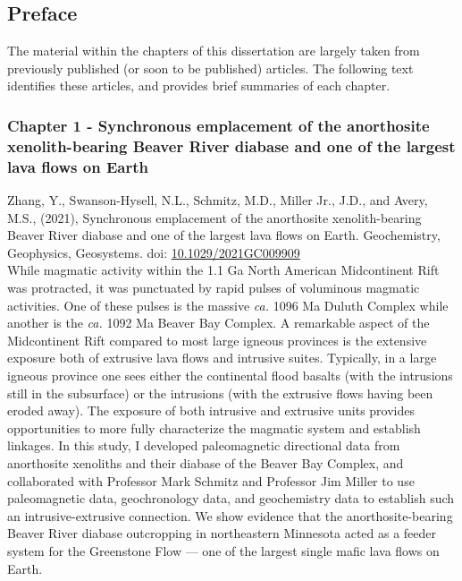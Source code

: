 \documentclass{ucbthesis}
\begin{document}
\begin{frontmatter}

\tableofcontents
\clearpage
\listoffigures
\clearpage
\listoftables

\clearpage


\chapter*{Preface}

The material within the chapters of this dissertation are largely taken from previously published (or soon to be published) articles. The following text identifies these articles, and provides brief summaries of each chapter.

\subsection{Chapter 1 - Synchronous emplacement of the anorthosite xenolith-bearing Beaver River diabase and one of the largest lava flows on Earth}

Zhang, Y., Swanson-Hysell, N.L., Schmitz, M.D., Miller Jr., J.D., and Avery, M.S., (2021), Synchronous emplacement of the anorthosite xenolith-bearing Beaver River diabase and one of the largest lava flows on Earth. Geochemistry, Geophysics, Geosystems. doi: \url{10.1029/2021GC009909}
\\

While magmatic activity within the 1.1 Ga North American Midcontinent Rift was protracted, it was punctuated by rapid pulses of voluminous magmatic activities. One of these pulses is the massive \textit{ca.} 1096 Ma Duluth Complex while another is the \textit{ca.} 1092 Ma Beaver Bay Complex. A remarkable aspect of the Midcontinent Rift compared to most large igneous provinces is the extensive exposure both of extrusive lava flows and intrusive suites. Typically, in a large igneous province one sees either the continental flood basalts (with the intrusions still in the subsurface) or the intrusions (with the extrusive flows having been eroded away). The exposure of both intrusive and extrusive units provides opportunities to more fully characterize the magmatic system and establish linkages. In this study, I developed paleomagnetic directional data from anorthosite xenoliths and their diabase of the Beaver Bay Complex, and collaborated with Professor Mark Schmitz and Professor Jim Miller to use paleomagnetic data, geochronology data, and geochemistry data to establish such an intrusive-extrusive connection. We show evidence that the anorthosite-bearing Beaver River diabase outcropping in northeastern Minnesota acted as a feeder system for the Greenstone Flow --- one of the largest single mafic lava flows on Earth.


\end{frontmatter}
\end{document}

